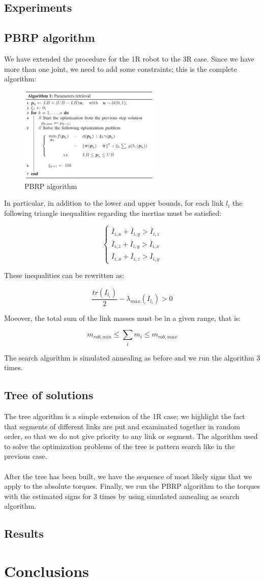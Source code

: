 \documentclass{article}
\begin{document}
\subsection{Experiments}
\subsection{PBRP algorithm}
We have extended the procedure for the 1R robot to the 3R case. Since we have more than one joint, we need to add some constraints; this is the complete algorithm:
\FloatBarrier
\begin{figure}[!htbp]
\centering
\includegraphics[width=0.6\textwidth]{images/3-dof/algorithm.png}
\caption{PBRP algorithm}
\end{figure}
\FloatBarrier
In particular, in addition to the lower and upper bounds,  for each link $l_i$ the following triangle inequalities regarding the inertias  must be satisfied:

\[\begin{cases}
\overline{I}_{i,x}+\overline{I}_{i,y} > \overline{I}_{i,z} \\
\overline{I}_{i,z}+\overline{I}_{i,y} > \overline{I}_{i,x} \\
\overline{I}_{i,x}+\overline{I}_{i,z} > \overline{I}_{i,y}
\end{cases}\]

These inequalities can be rewritten as:

\[\frac{tr(I_{l_i})}{2}-\lambda_{max}(I_{l_i})>0\]

Moeover, the total sum of the link masses must be in a given range, that is:

\[m_{rob,min}\le \sum_i{m_i} \le m_{rob,max}\]

The search algorithm is simulated annealing as before and we run the algorithm 3 times.
\subsection{Tree of solutions}
The tree algorithm is a simple extension of the 1R case; we highlight the fact that segments of different links are put and examinated together in random order, so that we do not give priority to any link or segment. The algorithm used to solve the optimization problems of the tree is pattern search like in the previous case.
\\\\
After the tree has been built, we have the sequence of most likely signs that we apply to the absolute torques. Finally, we run the PBRP algorithm to the torques with the estimated signs for 3 times by using simulated annealing as search algorithm.
\subsection{Results}
\section{Conclusions}
\end{document}
